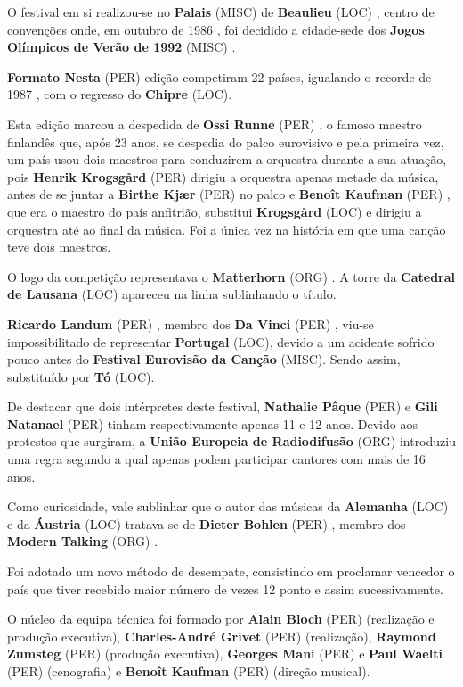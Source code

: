 \documentclass[12pt,a4paper]{article}
\begin{document}
O festival em si realizou-se no \textbf{Palais} (MISC) de \textbf{Beaulieu} (LOC) , centro de convenções onde, em outubro de 1986 , foi decidido a cidade-sede dos \textbf{Jogos Olímpicos de Verão de 1992} (MISC) .



\textbf{Formato Nesta} (PER) edição competiram 22 países, igualando o recorde de 1987 , com o regresso do \textbf{Chipre} (LOC).

Esta edição marcou a despedida de \textbf{Ossi Runne} (PER) , o famoso maestro finlandês que, após 23 anos, se despedia do palco eurovisivo e pela primeira vez, um país usou dois maestros para conduzirem a orquestra durante a sua atuação, pois \textbf{Henrik Krogsgård} (PER) dirigiu a orquestra apenas metade da música, antes de se juntar a \textbf{Birthe Kjær} (PER) no palco e \textbf{Benoît Kaufman} (PER) , que era o maestro do país anfitrião, substitui \textbf{Krogsgård} (LOC) e dirigiu a orquestra até ao final da música. Foi a única vez na história em que uma canção teve dois maestros.

O logo da competição representava o \textbf{Matterhorn} (ORG) . A torre da \textbf{Catedral de Lausana} (LOC) apareceu na linha sublinhando o título.

\textbf{Ricardo Landum} (PER) , membro dos \textbf{Da Vinci} (PER) , viu-se impossibilitado de representar \textbf{Portugal} (LOC), devido a um acidente sofrido pouco antes do \textbf{Festival Eurovisão da Canção} (MISC). Sendo assim, substituído por \textbf{Tó} (LOC).

De destacar que dois intérpretes deste festival, \textbf{Nathalie Pâque} (PER) e \textbf{Gili Natanael} (PER) tinham respectivamente apenas 11 e 12 anos. Devido aos protestos que surgiram, a \textbf{União Europeia de Radiodifusão} (ORG) introduziu uma regra segundo a qual apenas podem participar cantores com mais de 16 anos.

Como curiosidade, vale sublinhar que o autor das músicas da \textbf{Alemanha} (LOC) e da \textbf{Áustria} (LOC) tratava-se de \textbf{Dieter Bohlen} (PER) , membro dos \textbf{Modern Talking} (ORG) .

Foi adotado um novo método de desempate, consistindo em proclamar vencedor o país que tiver recebido maior número de vezes 12 ponto e assim sucessivamente.

O núcleo da equipa técnica foi formado por \textbf{Alain Bloch} (PER) (realização e produção executiva), \textbf{Charles-André Grivet} (PER) (realização), \textbf{Raymond Zumsteg} (PER) (produção executiva), \textbf{Georges Mani} (PER) e \textbf{Paul Waelti} (PER) (cenografia) e \textbf{Benoît Kaufman} (PER) (direção musical).
\end{document}
